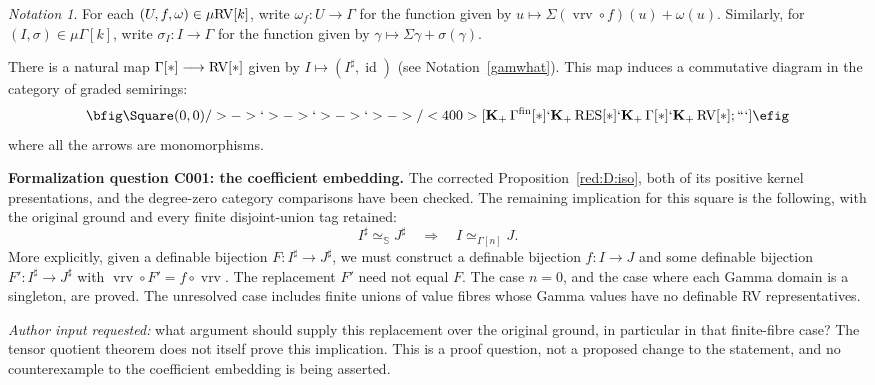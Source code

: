 \documentclass[12pt]{amsart}
\theoremstyle{plain}
\theoremstyle{definition}
\newtheorem{defn}[thm]{Definition}
\theoremstyle{remark}
\newtheorem{nota}[thm]{Notation}
\numberwithin{equation}{section}
\theoremstyle{plain}
\newcommand{\RV}{\textup{RV}}
\DeclareMathOperator{\id}{id}
\newcommand{\0}{\emptyset}
\newcommand{\fun}{\longrightarrow}
\newcommand{\efun}{\longmapsto}
\newcommand{\mgRV}{{\mu}{\RV}}
\newcommand{\mG}{{\mu}{\Gamma}}
\newcommand{\RES}{\textup{RES}}
\DeclareMathOperator{\gsk}{\mathbf{K}_+}
\DeclareMathOperator{\fin}{fin}
\DeclareMathOperator{\vrv}{vrv}
\begin{document}
\begin{nota}\label{comp:form}
For each $(U, f, \omega) \in \mgRV[k]$, write $\omega_f : U \fun \Gamma$ for the function given by $u \efun \Sigma(\vrv \circ f)(u) + \omega(u)$. Similarly, for $(I, \sigma) \in \mG[k]$, write $\sigma_I : I \fun \Gamma$ for the function given by $\gamma \efun \Sigma \gamma + \sigma(\gamma)$.
\end{nota}

%

There is a natural map $\Gamma[*] \fun \RV[*]$ given by $I \efun (I^\sharp, \id)$ (see Notation~\ref{gamwhat}). This map induces a commutative diagram in the category of graded semirings:
\[
\bfig
 \Square(0,0)/>->`>->`>->`>->/<400>[{\gsk \Gamma^{\fin}[*]}`{\gsk \RES[*]}`{\gsk \Gamma[*]}`{\gsk \RV[*]}; ```]
\efig
\]
where all the arrows are monomorphisms.

{\color{blue}
\noindent\textbf{Formalization question C001: the coefficient embedding.}
The corrected Proposition~\ref{red:D:iso}, both of its positive kernel
presentations, and the degree-zero category comparisons have been checked.
The remaining implication for this square is the following, with the
original ground and every finite disjoint-union tag retained:
\[
 I^{\sharp}\simeq_{\mathbb S}J^{\sharp}
 \quad\Longrightarrow\quad
 I\simeq_{\Gamma[n]}J.
\]
More explicitly, given a definable bijection
$F:I^{\sharp}\fun J^{\sharp}$, we must construct a definable bijection
$f:I\fun J$ and some definable bijection
$F':I^{\sharp}\fun J^{\sharp}$ with
$\vrv\circ F'=f\circ\vrv$. The replacement $F'$ need not equal $F$.
The case $n=0$, and the case where each Gamma domain is a singleton,
are proved. The unresolved case includes finite unions of value fibres
whose Gamma values have no definable RV representatives.

\noindent\emph{Author input requested:} what argument should supply this
replacement over the original ground, in particular in that finite-fibre
case? The tensor quotient theorem does not itself prove this implication.
This is a proof question, not a proposed change to the statement, and no
counterexample to the coefficient embedding is being asserted.
}
\end{document}
